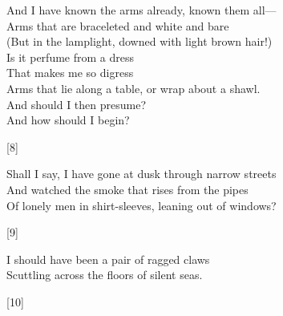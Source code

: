 \documentclass[twoside]{article}
\newcommand\tab[1][1cm]{\hspace*{#1}}
\begin{document}
\begin{multicols}{2}
\begin{minipage}{9cm}
\end{minipage}

\end{multicols}

\begin{multicols}{2}


\begin{minipage}{9cm}
    And I have known the arms already, known them all---\\
    Arms that are braceleted and white and bare\\
    (But in the lamplight, downed with light brown hair!)\\
    Is it perfume from a dress\\
    That makes me so digress\\
    Arms that lie along a table, or wrap about a shawl.\\
    \tab{}And should I then presume?\\
    \tab{}And how should I begin?
    \begin{center}[8]\end{center}
    \dotfill
\end{minipage}

\begin{minipage}{8.5cm}
Shall I say, I have gone at dusk through narrow streets\\
And watched the smoke that rises from the pipes\\
Of lonely men in shirt-sleeves, leaning out of windows?
\begin{center}[9]\end{center}
I should have been a pair of ragged claws\\
Scuttling across the floors of silent seas.\\
\begin{center}[10]\end{center}
\dotfill
\end{minipage}

\end{multicols}
\end{document}
